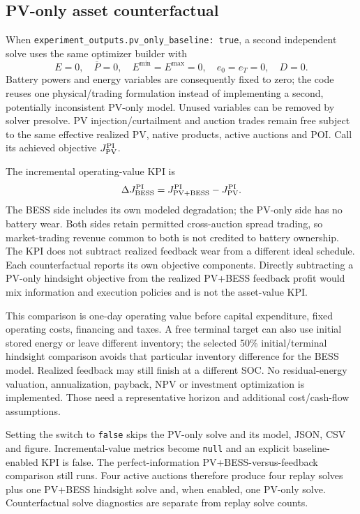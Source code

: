 \documentclass[11pt,a4paper]{article}
\begin{document}
\subsection{PV-only asset counterfactual}
When \texttt{experiment\_outputs.pv\_only\_baseline: true}, a second independent
solve uses the same optimizer builder with
\begin{equation}
 E=0,\quad\overline P=0,\quad E^{\min}=E^{\max}=0,\quad e_0=e_T=0,
 \quad D=0.
\end{equation}
Battery powers and energy variables are consequently fixed to zero; the code
reuses one physical/trading formulation instead of implementing a second,
potentially inconsistent PV-only model. Unused variables can be removed by
solver presolve. PV injection/curtailment and auction trades remain free subject
to the same effective realized PV, native products, active auctions and POI.
Call its achieved objective $J_{\rm PV}^{\rm PI}$.

The incremental operating-value KPI is
\begin{equation}\label{eq:value}
 \Delta J_{\rm BESS}^{\rm PI}
       =J_{\rm PV+BESS}^{\rm PI}-J_{\rm PV}^{\rm PI}.
\end{equation}
The BESS side includes its own modeled degradation; the PV-only side has no
battery wear. Both sides retain permitted cross-auction spread trading, so
market-trading revenue common to both is not credited to battery ownership.
The KPI does not subtract realized feedback wear from a different ideal schedule.
Each counterfactual reports its own objective components. Directly subtracting
a PV-only hindsight objective from the realized PV+BESS feedback profit would
mix information and execution policies and is not the asset-value KPI.

This comparison is one-day operating value before capital expenditure, fixed
operating costs, financing and taxes. A free terminal target can also use initial
stored energy or leave different inventory; the selected 50\% initial/terminal
hindsight comparison avoids that particular inventory difference for the BESS
model. Realized feedback may still finish at a different SOC. No residual-energy
valuation, annualization, payback, NPV or investment optimization is implemented.
Those need a representative horizon and additional cost/cash-flow assumptions.

Setting the switch to \texttt{false} skips the PV-only solve and its model, JSON,
CSV and figure. Incremental-value metrics become \texttt{null} and an explicit
baseline-enabled KPI is false. The perfect-information PV+BESS-versus-feedback
comparison still runs. Four active auctions therefore produce four replay
solves plus one PV+BESS hindsight solve and, when enabled, one PV-only solve.
Counterfactual solve diagnostics are separate from replay solve counts.
\end{document}
